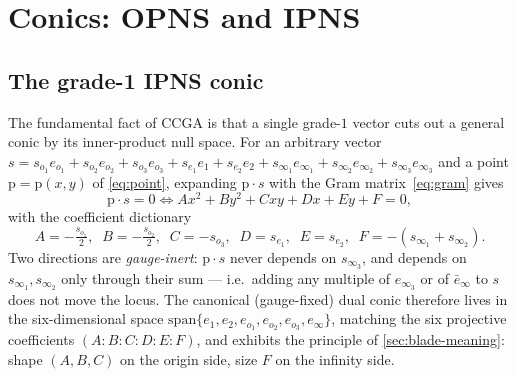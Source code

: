 \documentclass{birkjour}
\theoremstyle{definition}
\theoremstyle{remark}
\newcommand{\einf}{e_\infty}
\newcommand{\einfbar}{\bar e_\infty}
\begin{document}
\section{Conics: OPNS and IPNS}
\label{sec:conics}
\subsection{The grade-1 IPNS conic}
The fundamental fact of CCGA is that a single grade-$1$ vector cuts out a
general conic by its inner-product null space. For an arbitrary vector
$s = s_{o_1}e_{o_1}+s_{o_2}e_{o_2}+s_{o_3}e_{o_3}+s_{e_1}e_1+s_{e_2}e_2
+ s_{\infty_1}e_{\infty_1}+s_{\infty_2}e_{\infty_2}+s_{\infty_3}e_{\infty_3}$
and a point $\mathrm{p}=\mathrm{p}(x,y)$ of \cref{eq:point}, expanding
$\mathrm{p}\cdot s$ with the Gram matrix~\eqref{eq:gram} gives
\begin{equation}\label{eq:ipns-conic}
  \mathrm{p}\cdot s = 0 \iff A x^2 + B y^2 + C xy + D x + E y + F = 0 ,
\end{equation}
with the coefficient dictionary
\begin{equation}\label{eq:coeff-map}
  A=-\tfrac{s_{o_1}}{2},\;\; B=-\tfrac{s_{o_2}}{2},\;\; C=-s_{o_3},\;\;
  D=s_{e_1},\;\; E=s_{e_2},\;\; F=-(s_{\infty_1}{+}s_{\infty_2}).
\end{equation}
Two directions are \emph{gauge-inert}: $\mathrm{p}\cdot s$ never depends on
$s_{\infty_3}$, and depends on $s_{\infty_1},s_{\infty_2}$ only through their
sum --- i.e.\ adding any multiple of $e_{\infty_3}$ or of $\einfbar$ to $s$
does not move the locus. The canonical (gauge-fixed) dual conic therefore
lives in the six-dimensional space
$\mathrm{span}\{e_1,e_2,e_{o_1},e_{o_2},e_{o_3},\einf\}$, matching the six
projective coefficients $(A:B:C:D:E:F)$, and exhibits the principle of
\cref{sec:blade-meaning}: shape $(A,B,C)$ on the origin side, size $F$ on the
infinity side.
\end{document}

